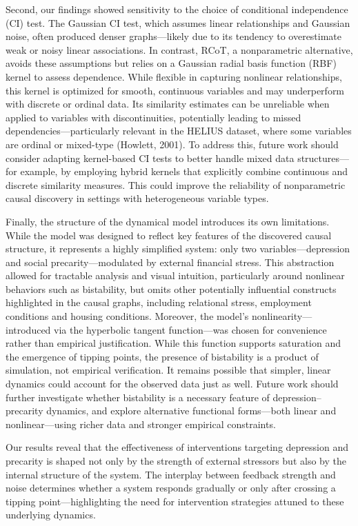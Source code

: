 \documentclass[
]{article}
\begin{document}
Second, our findings showed sensitivity to the choice of conditional
independence (CI) test. The Gaussian CI test, which assumes linear
relationships and Gaussian noise, often produced denser graphs---likely
due to its tendency to overestimate weak or noisy linear associations.
In contrast, RCoT, a nonparametric alternative, avoids these assumptions
but relies on a Gaussian radial basis function (RBF) kernel to assess
dependence. While flexible in capturing nonlinear relationships, this
kernel is optimized for smooth, continuous variables and may
underperform with discrete or ordinal data. Its similarity estimates can
be unreliable when applied to variables with discontinuities,
potentially leading to missed dependencies---particularly relevant in
the HELIUS dataset, where some variables are ordinal or mixed-type
(Howlett, 2001). To address this, future work should consider adapting
kernel-based CI tests to better handle mixed data structures---for
example, by employing hybrid kernels that explicitly combine continuous
and discrete similarity measures. This could improve the reliability of
nonparametric causal discovery in settings with heterogeneous variable
types.

Finally, the structure of the dynamical model introduces its own
limitations. While the model was designed to reflect key features of the
discovered causal structure, it represents a highly simplified system:
only two variables---depression and social precarity---modulated by
external financial stress. This abstraction allowed for tractable
analysis and visual intuition, particularly around nonlinear behaviors
such as bistability, but omits other potentially influential constructs
highlighted in the causal graphs, including relational stress,
employment conditions and housing conditions. Moreover, the model's
nonlinearity---introduced via the hyperbolic tangent function---was
chosen for convenience rather than empirical justification. While this
function supports saturation and the emergence of tipping points, the
presence of bistability is a product of simulation, not empirical
verification. It remains possible that simpler, linear dynamics could
account for the observed data just as well. Future work should further
investigate whether bistability is a necessary feature of
depression--precarity dynamics, and explore alternative functional
forms---both linear and nonlinear---using richer data and stronger
empirical constraints.

Our results reveal that the effectiveness of interventions targeting
depression and precarity is shaped not only by the strength of external
stressors but also by the internal structure of the system. The
interplay between feedback strength and noise determines whether a
system responds gradually or only after crossing a tipping
point---highlighting the need for intervention strategies attuned to
these underlying dynamics.
\end{document}
